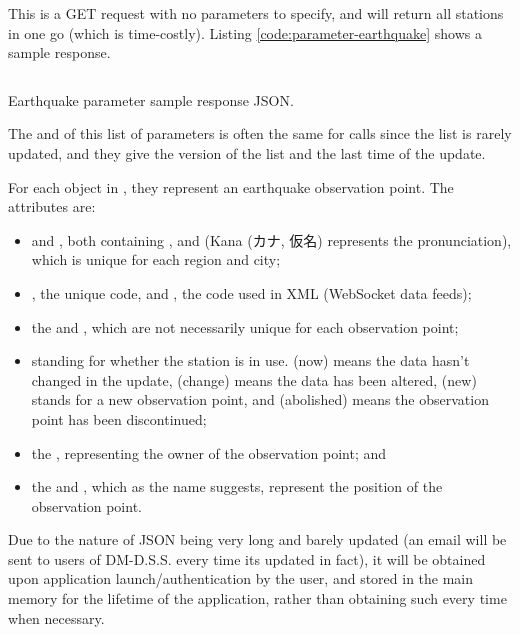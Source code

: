 This is a GET request with no parameters to specify, and will return all stations in one go (which is time-costly). Listing \ref{code:parameter-earthquake} shows a sample response.

\begin{listing}[htp]
    \inputminted{json}{code/ParameterEarthquake.json}
    \caption{Earthquake parameter sample response JSON.}
    \label{code:parameter-earthquake}
\end{listing}

The  and  of this list of parameters is often the same for calls since the list is rarely updated, and they give the version of the list and the last time of the update.

For each object in , they represent an earthquake observation point. The attributes are:
\begin{itemize}
    \item {} and , both containing ,  and  (Kana (カナ, 仮名) represents the pronunciation), which is unique for each region and city;
    \item {}, the unique code, and , the code used in XML (WebSocket data feeds);
    \item the  and , which are not necessarily unique for each observation point;
    \item {} standing for whether the station is in use.  (now) means the data hasn't changed in the update,  (change) means the data has been altered,  (new) stands for a new observation point, and  (abolished) means the observation point has been discontinued;
    \item the , representing the owner of the observation point; and
    \item the  and , which as the name suggests, represent the position of the observation point.
\end{itemize}

Due to the nature of JSON being very long and barely updated (an email will be sent to users of DM-D.S.S. every time its updated in fact), it will be obtained upon application launch/authentication by the user, and stored in the main memory for the lifetime of the application, rather than obtaining such every time when necessary.


